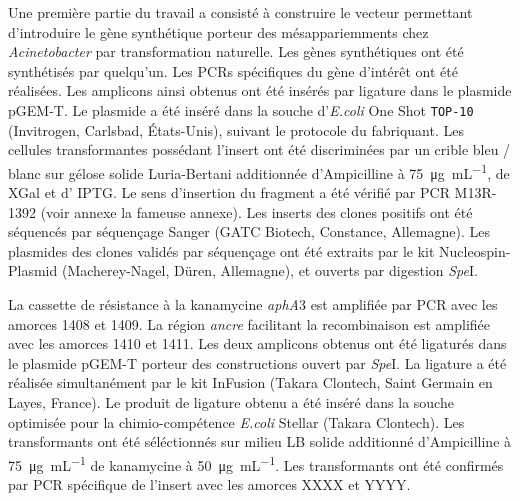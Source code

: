 Une première partie du travail a consisté à construire le vecteur permettant
d'introduire le gène synthétique porteur des mésappariemments chez
\emph{Acinetobacter} par transformation naturelle. Les gènes synthétiques ont
été synthétisés par quelqu'un.
Les PCRs spécifiques du gène d'intérêt ont été réalisées. Les amplicons ainsi
obtenus ont été insérés par ligature dans le plasmide pGEM-T. Le plasmide a été
inséré dans la souche d'\textit{E.coli} One
Shot\textsuperscript{{\textregistered}} \texttt{TOP-10} (Invitrogen, Carlsbad,
États-Unis), suivant le protocole du fabriquant. Les cellules transformantes
possédant l'insert ont été discriminées par un crible bleu / blanc sur gélose
solide Luria-Bertani additionnée d'Ampicilline à \SI{75}{\ug\per\mL}, de XGal et
d' IPTG. Le sens d'insertion du fragment a été vérifié par PCR M13R-1392 (voir
annexe la fameuse annexe).
Les inserts des clones positifs ont été séquencés par séquençage Sanger (GATC
Biotech, Constance, Allemagne). Les plasmides des clones validés par séquençage
ont été extraits par le kit Nucleospin-Plasmid (Macherey-Nagel, Düren,
Allemagne), et ouverts par digestion \emph{Spe}I.

La cassette de résistance à la kanamycine \emph{aphA}3 est amplifiée par PCR
avec les amorces 1408 et 1409. La région \emph{ancre} facilitant la
recombinaison est amplifiée avec les amorces 1410 et 1411. Les deux
amplicons obtenus ont été ligaturés dans le plasmide pGEM-T porteur des
constructions ouvert par \emph{Spe}I. La ligature a été réalisée simultanément
par le kit InFusion (Takara Clontech, Saint Germain en Layes, France). Le
produit de ligature obtenu a été inséré dans la souche optimisée pour la
chimio-compétence \emph{E.coli} Stellar (Takara Clontech). Les transformants ont
été séléctionnés sur milieu LB solide additionné d'Ampicilline à
\SI{75}{\ug\per\mL} de kanamycine à \SI{50}{\ug\per\mL}. Les transformants ont
été confirmés par PCR spécifique de l'insert avec les amorces XXXX et YYYY.


